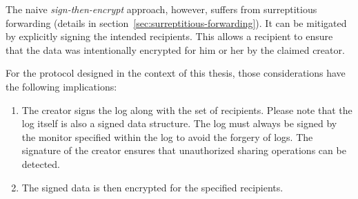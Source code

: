 \documentclass[../main.tex]{subfiles}
\begin{document}
The naive \textit{sign-then-encrypt} approach, however, suffers from surreptitious forwarding (details in section~\ref{sec:surreptitious-forwarding}). 
It can be mitigated by explicitly signing the intended recipients.
This allows a recipient to ensure that the data was intentionally encrypted for him or her by the claimed creator.~\cite{Davis2001}

For the protocol designed in the context of this thesis, those considerations have the following implications:
\begin{enumerate}
    \item 
    The creator signs the log along with the set of recipients.
    Please note that the log itself is also a signed data structure.
    The log must always be signed by the monitor specified within the log to avoid the forgery of logs.
    The signature of the creator ensures that unauthorized sharing operations can be detected.
    \item The signed data is then encrypted for the specified recipients.
\end{enumerate}
\end{document}
